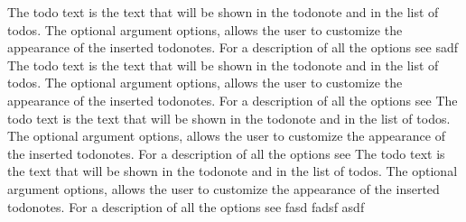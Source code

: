 










\frontmatter                    				%
\cleardoublepage					%
\cleardoublepage					%

\tableofcontents					%
\listoffigures						%

\listoftodos						%
	
\mainmatter                     %


\appendix

The todo text 
is the text that will be shown in the todonote and in the
list of todos. The optional argument options, allows the user to customize the
appearance of the inserted todonotes. For a description of all the options see
sadf
The todo text is the text that will be shown in the todonote and in the
list of todos. The optional argument options, allows the user to customize the
appearance of the inserted todonotes. For a description of all the options see
The todo text is the text that will be shown in the todonote and in the
list of todos. The optional argument options, allows the user to customize the
appearance of the inserted todonotes. For a description of all the options see
The todo text is the text that will be shown in the todonote and in the
list of todos. The optional argument options, allows the user to customize the
appearance of the inserted todonotes. For a description of all the options see
fasd
fadsf
asdf

\printbibliography  %


